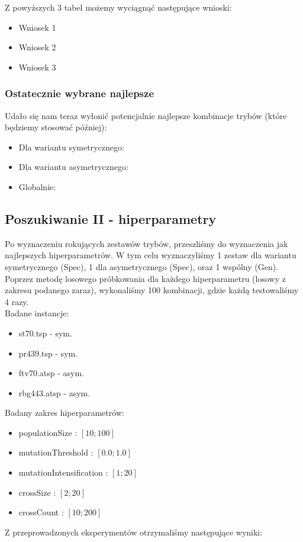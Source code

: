 \documentclass{article}
\begin{document}
Z powyższych 3 tabel możemy wyciągnąć następujące wnioski:
\begin{itemize}
	\item Wniosek 1
	\item Wniosek 2
	\item Wniosek 3
\end{itemize}

\subsubsection{Ostatecznie wybrane najlepsze}
Udało się nam teraz wyłonić potencjalnie najlepsze kombinacje trybów (które będziemy stosować później):
\begin{itemize}
	\item Dla wariantu symetrycznego:
	\item Dla wariantu asymetrycznego:
	\item Globalnie:
\end{itemize}

\newpage
\subsection{Poszukiwanie II - hiperparametry}
Po wyznaczeniu rokujących zestawów trybów, przeszliśmy do wyznaczenia jak najlepszych hiperparametrów. W tym celu wyznaczyliśmy 1 zestaw dla wariantu symetrycznego (Spec), 1 dla asymetrycznego (Spec), oraz 1 wspólny (Gen).\\
Poprzez metodę losowego próbkowania dla każdego hiperparametru (losowy z zakresu podanego zaraz), wykonaliśmy 100 kombinacji, gdzie każdą testowaliśmy 4 razy.\\
Badane instancje:
\begin{itemize}
	\item st70.tsp - sym.
	\item pr439.tsp - sym.
	\item ftv70.atsp - asym.
	\item rbg443.atsp - asym.
\end{itemize}
Badany zakres hiperparametrów:
\begin{itemize}
	\item populationSize : $[10 ; 100]$
	\item mutationThreshold : $[0.0 ; 1.0]$
	\item mutationIntensification : $[1 ; 20]$
	\item crossSize : $[2 ; 20]$
	\item crossCount : $[10 ; 200]$
\end{itemize}
Z przeprowadzonych eksperymentów otrzymaliśmy następujące wyniki:
\end{document}
